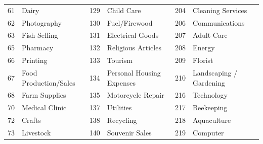 \begin{longtable}[]{|r|l|r|l|r|l|}
    61                                & Dairy                              & 129                               & Child Care                         & 204                               & Cleaning Services                  \\
    62                                & Photography                        & 130                               & Fuel/Firewood                      & 206                               & Communications                     \\
    63                                & Fish Selling                       & 131                               & Electrical Goods                   & 207                               & Adult Care                         \\
    65                                & Pharmacy                           & 132                               & Religious Articles                 & 208                               & Energy                             \\
    66                                & Printing                           & 133                               & Tourism                            & 209                               & Florist                            \\
    67                                & Food Production/Sales              & 134                               & Personal Housing Expenses          & 210                               &
    Landscaping / Gardening                                                                                                                                                                                                  \\
    68                                & Farm Supplies                      & 135                               & Motorcycle Repair                  & 216                               & Technology                         \\
    70                                & Medical Clinic                     & 137                               & Utilities                          & 217                               & Beekeeping                         \\
    72                                & Crafts                             & 138                               & Recycling                          & 218                               & Aquaculture                        \\
    73                                & Livestock                          & 140                               & Souvenir Sales                     & 219                               & Computer                           \\

\end{longtable}
